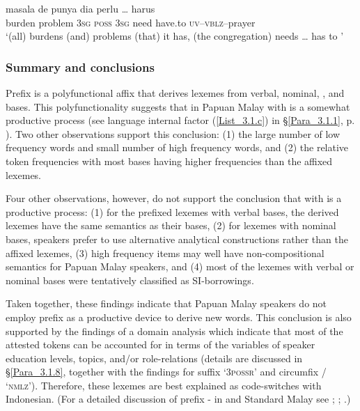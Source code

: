 \ea
\label{Example_3.57}
 {masala} {de} {punya} {dia} {perlu} {\ldots} {harus} {}\\ %
 burden  problem  \textsc{3sg}  \textsc{poss}  \textsc{3sg}  need {}   have.to  \textsc{uv}–\textsc{vblz}–prayer\\
 ‘(all) burdens (and) problems (that) it has, (the congregation) needs {\ldots} has to ’ \textstyleExampleSource{[080917-008-NP.0089/0091]}
\z

\subsubsection[Summary and conclusions]{Summary and conclusions}\label{Para_3.1.5.4}

Prefix  is a polyfunctional affix that derives lexemes from verbal, nominal, , and  bases. This polyfunctionality suggests that in Papuan Malay  with  is a somewhat productive process (see language internal factor (\ref{List_3.1.c}) in §\ref{Para_3.1.1}, p. \pageref{List_3.1.c}). Two other observations support this conclusion: (1) the large number of low frequency words and small number of high frequency words, and (2) the relative token frequencies with most bases having higher frequencies than the affixed lexemes.



Four other observations, however, do not support the conclusion that  with  is a productive process: (1) for the prefixed lexemes with verbal bases, the derived lexemes have the same semantics as their bases, (2) for lexemes with nominal bases, speakers prefer to use alternative analytical constructions rather than the affixed lexemes, (3) high frequency items may well have non-compositional semantics for Papuan Malay speakers, and (4) most of the lexemes with verbal or nominal bases were tentatively classified as SI-borrowings.



Taken together, these findings indicate that Papuan Malay speakers do not employ prefix  as a productive device to derive new words. This conclusion is also supported by the findings of a domain analysis which indicate that most of the attested tokens can be accounted for in terms of the variables of speaker education levels, topics, and/or role-relations (details are discussed in §\ref{Para_3.1.8}, together with the findings for suffix  ‘\textsc{3possr}’ and circumfix \textitbf{-}/\textitbf{-} ‘\textsc{nmlz}’). Therefore, these lexemes are best explained as code-switches with Indonesian. (For a detailed discussion of prefix - in  and Standard Malay see \citealt{Adelaar.1992}; \citealt{Mintz.1994}; \citealt{Sneddon.2010}.)


